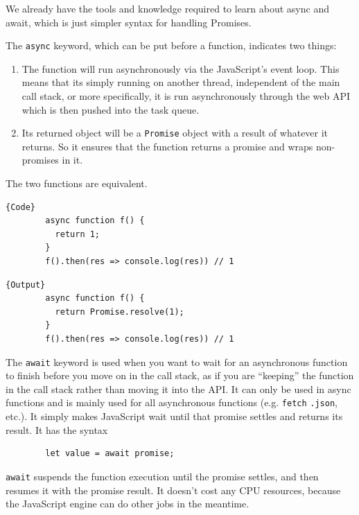 \documentclass{article}
\newcounter{definition}[section]
\newcounter{example}[section]
\begin{document}
    We already have the tools and knowledge required to learn about async and await, which is just simpler syntax for handling Promises. 

    \begin{definition}
      \label{def:async}
      The \texttt{async} keyword, which can be put before a function, indicates two things: 
      \begin{enumerate}
        \item The function will run asynchronously via the JavaScript's event loop. This means that its simply running on another thread, independent of the main call stack, or more specifically, it is run asynchronously through the web API which is then pushed into the task queue.   
        \item Its returned object will be a \texttt{Promise} object with a result of whatever it returns. So it ensures that the function returns a promise and wraps non-promises in it. 
      \end{enumerate}
    \end{definition}

    \begin{example}
      \label{ex:simple-async-function}
      The two functions are equivalent. 

      \noindent\begin{minipage}{.5\textwidth}
      \begin{lstlisting}[]{Code}
        async function f() {
          return 1; 
        }
        f().then(res => console.log(res)) // 1
      \end{lstlisting}
      \end{minipage}
      \hfill
      \begin{minipage}{.49\textwidth}
      \begin{lstlisting}[]{Output}
        async function f() {
          return Promise.resolve(1); 
        }
        f().then(res => console.log(res)) // 1
      \end{lstlisting}
      \end{minipage}
    \end{example}

    \begin{definition}
      \label{def:await}
      The \texttt{await} keyword is used when you want to wait for an asynchronous function to finish before you move on in the call stack, as if you are ``keeping'' the function in the call stack rather than moving it into the API. It can only be used in async functions and is mainly used for all asynchronous functions (e.g. \texttt{fetch} \texttt{.json}, etc.). It simply makes JavaScript wait until that promise settles and returns its result. It has the syntax 
      \begin{lstlisting}
        let value = await promise; 
      \end{lstlisting}
      \texttt{await} suspends the function execution until the promise settles, and then resumes it with the promise result. It doesn't cost any CPU resources, because the JavaScript engine can do other jobs in the meantime. 
    \end{definition}
\end{document}
